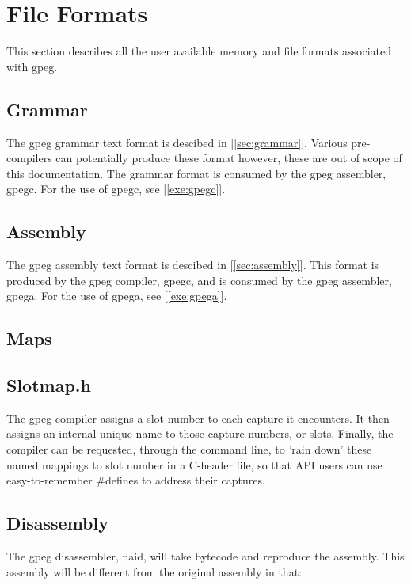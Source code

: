 \section{File Formats}

This section describes all the user available memory and file formats
associated with gpeg.

\subsection{Grammar}

The gpeg grammar text format is descibed in [\ref{sec:grammar}].
Various pre-compilers can potentially produce these format however,
these are out of scope of this documentation. The grammar format is
consumed by the gpeg assembler, gpegc. For the use of gpegc, see
[\ref{exe:gpegc}].

\subsection{Assembly}

The gpeg assembly text format is descibed in [\ref{sec:assembly}].
This format is produced by the gpeg compiler, gpegc,
and is consumed by the gpeg assembler, gpega.
For the use of gpega, see [\ref{exe:gpega}].

\subsection{Maps}

\subsection{Slotmap.h}

The gpeg compiler assigns a slot number to each capture it encounters.
It then assigns an internal unique name to those capture numbers, or slots.
Finally, the compiler can be requested, through the command line, to
'rain down' these named mappings to slot number in a C-header file, so that
API users can use easy-to-remember \#defines to address their captures.

\subsection{Disassembly}

The gpeg disassembler, naid, will take bytecode and reproduce the
assembly. This assembly will be different from the original assembly
in that:

